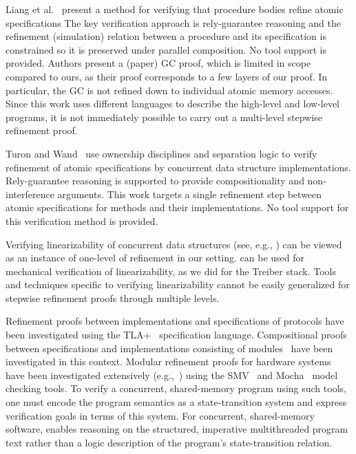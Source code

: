Liang et al.~\cite{LiangRGSim} present a method for verifying that procedure
bodies refine atomic specifications
The key verification approach is
rely-guarantee reasoning and the refinement (simulation) relation between
a procedure and its specification is constrained so it is preserved under
parallel composition. 
No tool support is provided. 
Authors present a (paper) GC proof, which is limited in scope compared
to ours, as their proof corresponds to a few layers of our proof. In particular,
the GC is not refined down to individual atomic memory accesses. 
Since this work uses different languages to describe the high-level
and low-level programs, it is not immediately possible to carry out a
multi-level stepwise refinement proof. 

Turon and Wand~\cite{TuronM11} use ownership disciplines and
separation logic to verify refinement of atomic specifications by 
concurrent data structure implementations. 
Rely-guarantee reasoning is
supported to provide compositionality and non-interference
arguments. 
This work targets a single refinement step between atomic
specifications for methods and their implementations. 
No tool support for this verification method is provided. 

Verifying linearizability of concurrent data structures (see, e.g.,
\cite{tacasLin,aliLin}) can be viewed as an instance of one-level of
refinement in our setting. 
\civl can be used for mechanical
verification of linearizability, as we did for the Treiber stack. 
Tools and techniques specific to verifying linearizability
cannot be easily generalized for stepwise refinement proofs
through multiple levels. 

Refinement proofs
between implementations and specifications of protocols have been
investigated using the TLA+~\cite{Lamport2004} specification
language. 
Compositional proofs between specifications and
implementations consisting of modules~\cite{AbadiAssumeGuarantee} have
been investigated in this context. 
Modular refinement proofs for hardware systems have been investigated extensively
(e.g.,~\cite{Henzinger1999,Eiriksson2000}) using the SMV~\cite{McMillan00} and Mocha~\cite{AlurHMQRT98} 
model checking tools.
To verify a concurrent, shared-memory program using such tools, one must encode
the program semantics as a state-transition system and express
verification goals in terms of this system. 
For concurrent, shared-memory
software, \civl enables reasoning on the structured, imperative
multithreaded program text rather than a logic description of the
program's state-transition relation. 
 

